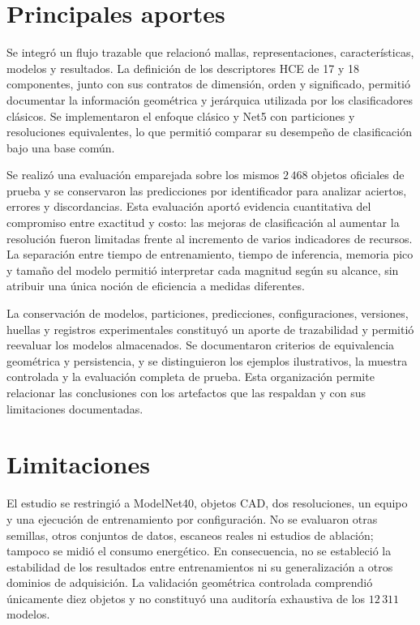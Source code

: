 \section{Principales aportes}
Se integró un flujo trazable que relacionó mallas, representaciones, características, modelos y resultados. La definición de los descriptores HCE de 17 y 18 componentes, junto con sus contratos de dimensión, orden y significado, permitió documentar la información geométrica y jerárquica utilizada por los clasificadores clásicos. Se implementaron el enfoque clásico y Net5 con particiones y resoluciones equivalentes, lo que permitió comparar su desempeño de clasificación bajo una base común.

Se realizó una evaluación emparejada sobre los mismos $2\,468$ objetos oficiales de prueba y se conservaron las predicciones por identificador para analizar aciertos, errores y discordancias. Esta evaluación aportó evidencia cuantitativa del compromiso entre exactitud y costo: las mejoras de clasificación al aumentar la resolución fueron limitadas frente al incremento de varios indicadores de recursos. La separación entre tiempo de entrenamiento, tiempo de inferencia, memoria pico y tamaño del modelo permitió interpretar cada magnitud según su alcance, sin atribuir una única noción de eficiencia a medidas diferentes.

La conservación de modelos, particiones, predicciones, configuraciones, versiones, huellas y registros experimentales constituyó un aporte de trazabilidad y permitió reevaluar los modelos almacenados. Se documentaron criterios de equivalencia geométrica y persistencia, y se distinguieron los ejemplos ilustrativos, la muestra controlada y la evaluación completa de prueba. Esta organización permite relacionar las conclusiones con los artefactos que las respaldan y con sus limitaciones documentadas.

\section{Limitaciones}
El estudio se restringió a ModelNet40, objetos CAD, dos resoluciones, un equipo y una ejecución de entrenamiento por configuración. No se evaluaron otras semillas, otros conjuntos de datos, escaneos reales ni estudios de ablación; tampoco se midió el consumo energético. En consecuencia, no se estableció la estabilidad de los resultados entre entrenamientos ni su generalización a otros dominios de adquisición. La validación geométrica controlada comprendió únicamente diez objetos y no constituyó una auditoría exhaustiva de los $12\,311$ modelos.

